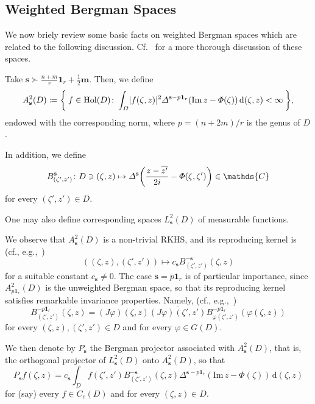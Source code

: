 \documentclass[10.5pt,reqno]{amsart}
\newcommand{\Hol}{\mathrm{Hol}}
\newcommand{\vect}[1]{\mathbf{{#1}}}
\newcommand{\dd}{\mathrm{d}}
\DeclarePairedDelimiter{\abs}{\lvert}{\rvert}
\let\originalleft\left
\let\originalright\right
\renewcommand{\left}{\mathopen{}\mathclose\bgroup\originalleft}
\renewcommand{\right}{\aftergroup\egroup\originalright}
\newcommand{\C}{\mathds{C}}
\renewcommand{\Im}{\mathrm{Im}\,}
\renewcommand{\phi}{\varphi}
\begin{document}
\subsection{Weighted Bergman Spaces}\label{sec:Bergman}


We now briely review some basic facts on weighted Bergman spaces which are  related to the following discussion. Cf.~\cite{CalziPeloso} for a more thorough discussion of these spaces.

\begin{deff}\label{def:5}
	Take  $\vect s\succ \frac{n+m}{r}\vect 1_r+\frac 1 2 \vect m $. Then, we define 
	\[
	A^{2}_{\vect s}(D)\coloneqq \Set{f\in \Hol(D)\colon \int_{\Omega} \abs{f(\zeta,z)}^2 \Delta^{\vect s-p\vect 1_r}(\Im z-\Phi(\zeta))\,\dd (\zeta,z)<\infty   },
	\]
	endowed with the corresponding norm, where $p=(n+2m )/r$ is the genus of $D$. 
	
	In addition, we define
	\[
	B^{\vect s}_{(\zeta',z')}\colon D\ni (\zeta,z)\mapsto\Delta^{\vect s}\left(\frac{z-\overline{z'}}{2 i}-\Phi(\zeta,\zeta')  \right)\in \C
	\]
	for every $(\zeta',z')\in D$. 
\end{deff}

One may also define corresponding spaces $L^2_{\vect s}(D)$ of measurable functions.

We observe that  $A^{2}_{\vect s}(D)$ is a non-trivial RKHS, and its reproducing kernel is (cf., e.g.,~\cite[Proposition 3.11]{CalziPeloso})
\[
((\zeta,z),(\zeta',z'))\mapsto c_{\vect s} B^{-\vect s }_{(\zeta',z')}(\zeta,z)
\]
for a suitable constant $c_{\vect s}\neq 0$. The case $\vect s=p \vect 1_r$ is of particular importance, since  $A^2_{p\vect 1_r}(D)$ is the unweighted Bergman space, so that its reproducing kernel satisfies remarkable invariance properties. Namely, (cf., e.g.,~\cite[Proposition 1.4.12]{Krantz})
\begin{equation}\label{eq:2b}
 B^{-p\vect 1_r}_{(\zeta',z')}(\zeta,z)=(J\phi)(\zeta,z) \overline{(J\phi)(\zeta',z')} B^{-p\vect 1_r}_{\phi(\zeta',z')}(\phi(\zeta,z))
\end{equation}
for every $(\zeta,z),(\zeta',z')\in D$ and for every $\phi\in G(D)$.




We then denote by $P_{\vect s}$ the  Bergman projector associated with $A^2_{\vect s}(D)$, that is, the orthogonal projector of  $L^2_{\vect s}(D)$ onto $ A^2_{\vect s}(D)$, so that
\[
P_{\vect s} f(\zeta,z)= c_{\vect s}\int_D f(\zeta',z') B^{-\vect s}_{(\zeta',z')}(\zeta,z)\Delta^{ \vect s-p\vect 1_r}(\Im z-\Phi(\zeta))\,\dd (\zeta,z)
\]
for (say) every $f\in C_c(D)$ and for every $(\zeta,z)\in D$.
\end{document}
